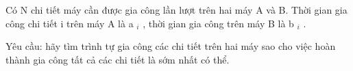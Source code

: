 Có N chi tiết máy cần được gia công lần lượt trên hai máy A và B. Thời gian gia công chi tiết i trên máy A là a   $_    i   $   , thời gian gia công trên máy B là b   $_    i   $   .  

   Yêu cầu: hãy tìm trình tự gia công các chi tiết trên hai máy sao cho việc hoàn thành gia công tất cả các chi tiết là sớm nhất có thể.  

\